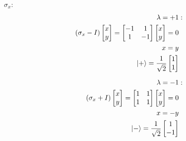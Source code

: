 \documentclass[12pt]{article}
\begin{document}
 $\sigma_x$:
\begin{equation}
\begin{split}
\lambda = +1 &: \\
(\sigma_x - I)
\begin{bmatrix}
x \\ y
\end{bmatrix}
=
\begin{bmatrix}
-1 & 1 \\
1 & -1
\end{bmatrix}
\begin{bmatrix}
x \\ y
\end{bmatrix}
= 0 \\
x = y \\
\ket{+}
=
\frac{1}{\sqrt{2}}
\begin{bmatrix}
1 \\ 1
\end{bmatrix}
\\[6pt]
\lambda = -1 &: \\
(\sigma_x + I)
\begin{bmatrix}
x \\ y
\end{bmatrix}
=
\begin{bmatrix}
1 & 1 \\
1 & 1
\end{bmatrix}
\begin{bmatrix}
x \\ y
\end{bmatrix}
= 0 \\
x = -y \\
\ket{-}
=
\frac{1}{\sqrt{2}}
\begin{bmatrix}
1 \\ -1
\end{bmatrix}
\end{split}
\end{equation}
\end{document}
